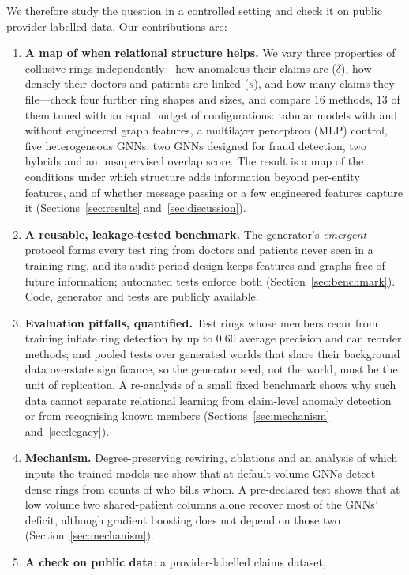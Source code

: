 \documentclass[pdflatex,sn-vancouver-num]{sn-jnl}
\begin{document}
We therefore study the question in a controlled setting and check it on
public provider-labelled data. Our contributions are:
\begin{enumerate}
\item \textbf{A map of when relational structure helps.} We vary three
  properties of collusive rings independently---how anomalous their claims are
  ($\delta$), how densely their doctors and patients are linked ($s$), and how
  many claims they file---check four further ring shapes and sizes, and
  compare 16 methods, 13 of them tuned with an equal budget of configurations:
  tabular models with and without engineered graph features, a multilayer
  perceptron (MLP) control, five heterogeneous GNNs, two GNNs designed for
  fraud detection, two hybrids and an
  unsupervised overlap score. The result is a map of the conditions under
  which structure adds information beyond per-entity features, and of whether
  message passing or a few engineered features capture it
  (Sections~\ref{sec:results} and~\ref{sec:discussion}).
\item \textbf{A reusable, leakage-tested benchmark.} The generator's
  \emph{emergent} protocol forms every test ring from doctors and patients
  never seen in a training ring, and its audit-period design keeps features
  and graphs free of future information; automated tests enforce both
  (Section~\ref{sec:benchmark}). Code, generator and tests are publicly
  available.
\item \textbf{Evaluation pitfalls, quantified.} Test rings whose members
  recur from training inflate ring detection by up to 0.60 average precision
  and can reorder methods; and pooled tests over generated worlds that share
  their background data overstate significance, so the generator seed, not
  the world, must be the unit of replication. A re-analysis of a small fixed
  benchmark shows why such data cannot separate relational learning from
  claim-level anomaly detection or from recognising known members
  (Sections~\ref{sec:mechanism} and~\ref{sec:legacy}).
\item \textbf{Mechanism.} Degree-preserving rewiring, ablations and an
  analysis of which inputs the trained models use show that at default volume
  GNNs detect dense rings from counts of who bills whom. A pre-declared test
  shows that at low volume two shared-patient columns alone recover most of
  the GNNs' deficit, although gradient boosting does not depend on those two
  (Section~\ref{sec:mechanism}).
\item \textbf{A check on public data}: a provider-labelled claims dataset,

\end{enumerate}
\end{document}
